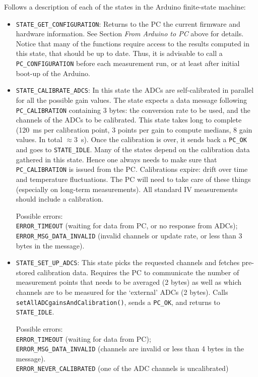 \documentclass[11pt,a4paper,english]{article}
\begin{document}
\vspace*{\baselineskip}
\noindent{}Follows a description of each of the states in the Arduino finite-state machine:
\begin{itemize}
\item \texttt{STATE\_GET\_CONFIGURATION}: Returns to the PC the current firmware and hardware information. See Section \textit{From Arduino to PC} above for details. Notice that many of the functions require access to the results computed in this state, that should be up to date. Thus, it is advisable to call a \texttt{PC\_CONFIGURATION} before each measurement run, or at least after initial boot-up of the Arduino.

\item \texttt{STATE\_CALIBRATE\_ADCS}: In this state the ADCs are self-calibrated in parallel for all the possible gain values. The state expects a data message following \texttt{PC\_CALIBRATION} containing 3 bytes: the conversion rate to be used, and the channels of the ADCs to be calibrated. This state takes long to complete (120~ms per calibration point, 3 points per gain to compute medians, 8 gain values. In total $\approx3$~s). Once the calibration is over, it sends back a \texttt{PC\_OK} and goes to \texttt{STATE\_IDLE}. Many of the states depend on the calibration data gathered in this state. Hence one always needs to make sure that \texttt{PC\_CALIBRATION} is issued from the PC. Calibrations expire: drift over time and temperature fluctuations. The PC will need to take care of these things (especially on long-term measurements). All standard IV measurements should include a calibration.

    Possible errors:\\\texttt{ERROR\_TIMEOUT} (waiting for data from PC, or no response from ADCs);\\\texttt{ERROR\_MSG\_DATA\_INVALID} (invalid channels or update rate, or less than 3 bytes in the message).

\item \texttt{STATE\_SET\_UP\_ADCS}: This state picks the requested channels and fetches pre-stored calibration data. Requires the PC to communicate the number of measurement points that needs to be averaged (2 bytes) as well as which channels are to be measured for the `external' ADCs (2 bytes). Calls \texttt{setAllADCgainsAndCalibration()}, sends a \texttt{PC\_OK}, and returns to \texttt{STATE\_IDLE}.

	Possible errors:\\\texttt{ERROR\_TIMEOUT} (waiting for data from PC);\\\texttt{ERROR\_MSG\_DATA\_INVALID} (channels are invalid or less than 4 bytes in the message).\\\texttt{ERROR\_NEVER\_CALIBRATED} (one of the ADC channels is uncalibrated)


\end{itemize}
\end{document}
